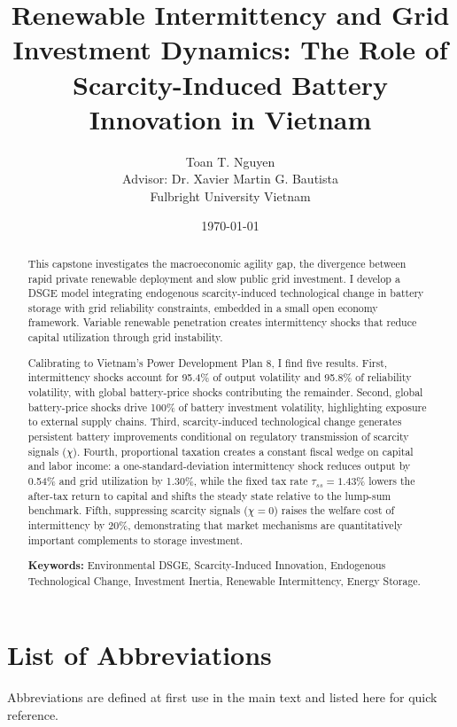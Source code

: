 \documentclass[12pt, a4paper]{article}
\title{Renewable Intermittency and Grid Investment Dynamics: The Role of Scarcity-Induced Battery Innovation in Vietnam}
\author{Toan T. Nguyen \\ \small{Advisor: Dr. Xavier Martin G. Bautista} \\ \small{Fulbright University Vietnam}}
\date{\today}
\begin{document}
	
	\maketitle
	
	\tableofcontents
	\clearpage
	
	\begin{abstract}
		This capstone investigates the macroeconomic agility gap, the divergence between rapid private renewable deployment and slow public grid investment. I develop a DSGE model integrating endogenous scarcity-induced technological change in battery storage with grid reliability constraints, embedded in a small open economy framework. Variable renewable penetration creates intermittency shocks that reduce capital utilization through grid instability.
		
		Calibrating to Vietnam's Power Development Plan 8, I find five results. First, intermittency shocks account for 95.4\% of output volatility and 95.8\% of reliability volatility, with global battery-price shocks contributing the remainder. Second, global battery-price shocks drive 100\% of battery investment volatility, highlighting exposure to external supply chains. Third, scarcity-induced technological change generates persistent battery improvements conditional on regulatory transmission of scarcity signals ($\chi$). Fourth, proportional taxation creates a constant fiscal wedge on capital and labor income: a one-standard-deviation intermittency shock reduces output by 0.54\% and grid utilization by 1.30\%, while the fixed tax rate $\tau_{ss}=1.43\%$ lowers the after-tax return to capital and shifts the steady state relative to the lump-sum benchmark. Fifth, suppressing scarcity signals ($\chi = 0$) raises the welfare cost of intermittency by 20\%, demonstrating that market mechanisms are quantitatively important complements to storage investment.
		
		\vspace{0.5cm}
		\noindent \textbf{Keywords:} Environmental DSGE, Scarcity-Induced Innovation, Endogenous Technological Change, Investment Inertia, Renewable Intermittency, Energy Storage.
	\end{abstract}
	\clearpage
	
	\section*{List of Abbreviations}
	\noindent Abbreviations are defined at first use in the main text and listed here for quick reference.
	
\end{document}

